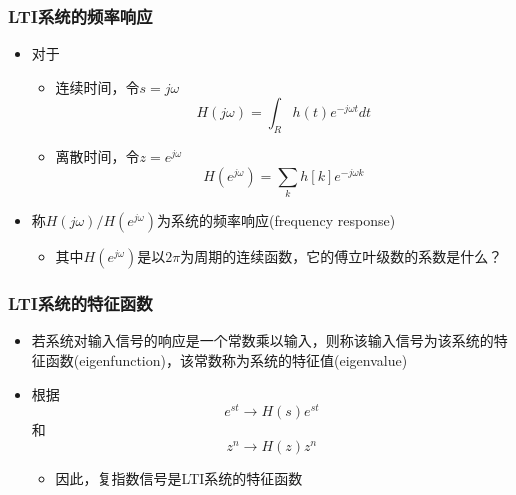 \documentclass[CJKutf8,xcolor=pdftex,dvipsnames,table]{beamer}
\begin{document}
\begin{CJK*}{UTF8}{song}
  \begin{frame}
    \frametitle{LTI系统的频率响应}
    \begin{itemize}
    \item 对于
		\begin{itemize}
		\item 连续时间，令$s=j\omega$
		\[ 
			H(j\omega) = \int_R h(t)e^{-j\omega t} dt 
		\]
		\item 离散时间，令$z=e^{j\omega}$
		\[ 
			H(e^{j\omega}) = \sum_k h[k]e^{-j\omega k}
		\]
		\end{itemize}
	\item 称$H(j\omega)/H(e^{j\omega})$为系统的频率响应(frequency response)
		\begin{itemize}
		\item 其中$H(e^{j\omega})$是以$2\pi$为周期的连续函数，它的傅立叶级数的系数是什么？
		\end{itemize}
    \end{itemize}
  \end{frame} 
            
  \begin{frame}
    \frametitle{LTI系统的特征函数}
    \begin{itemize}
    \item 若系统对输入信号的响应是一个常数乘以输入，则称该输入信号为该系统的特征函数(eigenfunction)，该常数称为系统的特征值(eigenvalue)
    \item 根据
    \[
    	e^{st} \rightarrow H(s)e^{st}
	\]
	和
	\[
		z^{n} \rightarrow H(z)z^{n}
	\]
	    \begin{itemize}
		\item 因此，复指数信号是LTI系统的特征函数
		\end{itemize}
    \end{itemize}
  \end{frame}           
              

\end{CJK*}
\end{document}
